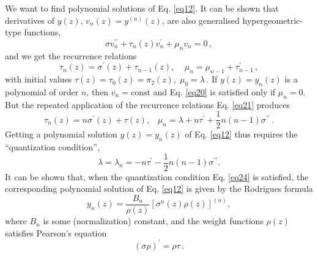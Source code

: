 \documentclass[preprint,showpacs,preprintnumbers,amsmath,amssymb,nofootinbib]{revtex4}
\begin{document}
We want to find polynomial solutions of Eq. \eqref{eq12}. It can be shown that derivatives of $y(z)$, $v_n(z)=y^{(n)}(z)$, are also generalised hypergeometric-type functions,
\begin{equation}
\sigma v_n^{\prime\prime}+\tau_n(z)v_n^\prime +\mu_nv_n=0\,,
\label{eq20}
\end{equation}
and we get the recurrence relations 
\begin{equation}
\tau_n(z)=\sigma^\prime(z)+\tau_{n-1}(z),\;\;\;\;\mu_n=\mu_{n-1}+\tau_{n-1}^\prime\,,
\label{eq21}
\end{equation}
with initial values
$\tau(z)=\tau_0(z)=\pi_2(z),\;\mu_0=\lambda\,.
$ 
If $y(z)=y_n(z)$ is a polynomial of order $n$, then $v_n=\mathrm{const}$ and  Eq. \eqref{eq20} is satisfied only if $\mu_n=0$. But the repeated application of the recurrence relations Eq. \eqref{eq21}  produces
\begin{equation}
\tau_n(z)=n\sigma^\prime(z)+\tau(z),\;\;\;\mu_n=\lambda+n\tau^\prime+\frac{1}{2}n(n-1)\sigma^{\prime\prime}\,.
\label{eq23}
\end{equation}
Getting a polynomial solution $y(z)=y_n(z)$ of Eq. \eqref{eq12} 
thus requires the ``quantization condition'',
\begin{equation}
\lambda=\lambda_n=- n\tau^\prime-\frac{1}{2}n(n-1)\sigma^{\prime\prime}.
\label{eq24}
\end{equation}
It can be shown \cite{NikiUvar} that, when the quantization condition Eq. \eqref{eq24} is satisfied, the corresponding polynomial solution of Eq. \eqref{eq12} is given by the Rodrigues formula
\begin{equation}
y_n(z)=\frac{B_n}{\rho(z)}\left[\sigma^n(z)\rho(z)\right]^{(n)},
\label{eq31}
\end{equation}
where $B_n$ is some (normalization) constant, and the weight functions $\rho(z)$ satisfies Pearson's equation \cite{Ismail}  
\begin{equation}
(\sigma\rho)^\prime=\rho\tau\,.
\label{eq25}
\end{equation}

\end{document}

